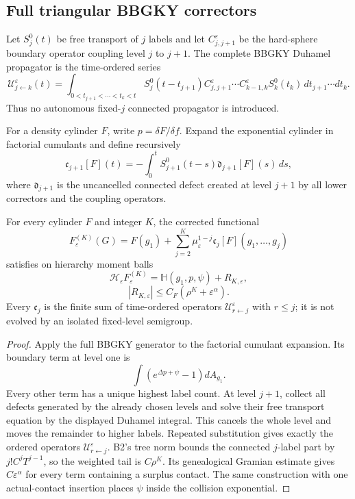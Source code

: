 \subsection{Full triangular BBGKY correctors}

Let \(S_j^0(t)\) be free transport of \(j\) labels and let
\(C_{j,j+1}^\varepsilon\) be the hard-sphere boundary operator coupling level
\(j\) to \(j+1\).  The complete BBGKY Duhamel propagator is the time-ordered
series
\[
 \mathcal U_{j\leftarrow k}^\varepsilon(t)=
 \int_{0<t_{j+1}<\cdots<t_k<t}
 S_j^0(t-t_{j+1})C_{j,j+1}^\varepsilon\cdots
 C_{k-1,k}^\varepsilon S_k^0(t_k)
 \,dt_{j+1}\cdots dt_k.
\]
Thus no autonomous fixed-\(j\) connected propagator is introduced.

For a density cylinder \(F\), write \(p=\delta F/\delta f\).  Expand the
exponential cylinder in factorial cumulants and define recursively
\[
 \mathfrak c_{j+1}[F](t)
 =-\int_0^tS_{j+1}^0(t-s)
 \mathfrak d_{j+1}[F](s)\,ds,
\]
where \(\mathfrak d_{j+1}\) is the uncancelled connected defect created at
level \(j+1\) by all lower correctors and the coupling operators.

\begin{lemma}
\label{lem:r5-b4-corrector}
For every cylinder \(F\) and integer \(K\), the corrected functional
\[
 F_{\varepsilon}^{(K)}(G)=
 F(g_1)+\sum_{j=2}^K\mu_\varepsilon^{1-j}
 \mathfrak c_j[F](g_1,\ldots,g_j)
\]
satisfies on hierarchy moment balls
\[
 \mathscr H_\varepsilon F_{\varepsilon}^{(K)}
 =\mathbb H\left(g_1,p,\psi\right)
 +R_{K,\varepsilon},
\]
\[
 |R_{K,\varepsilon}|
 \le C_F(\rho^K+\varepsilon^\alpha).
\]
Every \(\mathfrak c_j\) is the finite sum of time-ordered operators
\(\mathcal U_{r\leftarrow j}^\varepsilon\) with \(r\le j\); it is not evolved
by an isolated fixed-level semigroup.
\end{lemma}

\begin{proof}
Apply the full BBGKY generator to the factorial cumulant expansion.  Its
boundary term at level one is
\[
 \int(e^{\Delta p+\psi}-1)dA_{g_1}.
\]
Every other term has a unique highest label count.  At level \(j+1\), collect
all defects generated by the already chosen levels and solve their free
transport equation by the displayed Duhamel integral.  This cancels the whole
level and moves the remainder to higher labels.  Repeated substitution gives
exactly the ordered operators \(\mathcal U_{r\leftarrow j}^\varepsilon\).
B2's tree norm bounds the connected \(j\)-label part by
\(j!C^jT^{j-1}\), so the weighted tail is \(C\rho^K\).  Its genealogical
Gramian estimate gives \(C\varepsilon^\alpha\) for every term containing a
surplus contact.  The same construction with one actual-contact insertion
places \(\psi\) inside the collision exponential.
\end{proof}

